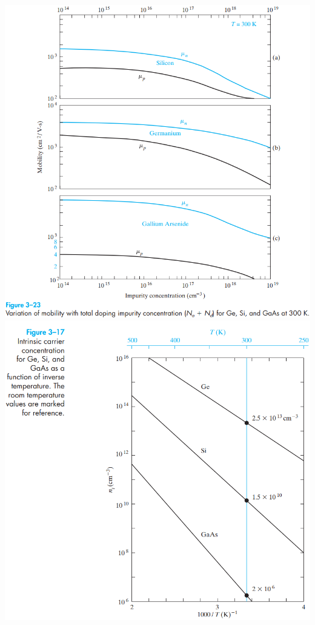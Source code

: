 \documentclass{article}
\begin{document}
\begin{large}
	\begin{center}
	\includegraphics[width=\textwidth]{fig1}
	\includegraphics[width=\textwidth]{fig2}

\end{center}
\end{large}
\end{document}
